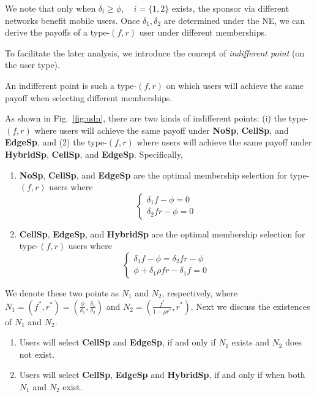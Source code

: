 We note that only when $\delta_i \ge \phi,\quad i=\{1,2\}$ exists, the sponsor via different networks benefit mobile users. Once $\delta_1, \delta_2$ are determined under the NE, we can derive the payoffs of a type-$(f, r)$ user under different memberships.

To facilitate the later analysis, we introduce the concept of \emph{indifferent point} (on the user type). 

\begin{myDef} An indifferent point is such a type-$(f, r)$ on which users will achieve the same payoff when selecting different memberships.\end{myDef}


As shown in Fig.~\ref{fig:udn}, there are two kinds of indifferent points: (i) the type-$(f, r)$ where users will achieve the same payoff under \textbf{NoSp}, \textbf{CellSp}, and \textbf{EdgeSp}, and (2) the type-$(f, r)$ where users will achieve the same payoff under \textbf{HybridSp}, \textbf{CellSp}, and \textbf{EdgeSp}. Specifically,

\begin{enumerate}
\item \textbf{NoSp}, \textbf{CellSp}, and \textbf{EdgeSp} are the optimal membership selection for type-$(f, r)$ users where
\begin{equation}
\left\{\begin{array}{ll}
\delta_1f-\phi=0\\
\delta_2fr-\phi=0
\end{array}\right.
\end{equation}

\item \textbf{CellSp}, \textbf{EdgeSp}, and \textbf{HybridSp} are the optimal membership selection for type-$(f, r)$ users where
\begin{equation}
\left\{\begin{array}{ll}
\delta_1f-\phi=\delta_2fr-\phi\\
\phi+\delta_1\rho fr-\delta_1f=0
\end{array}\right.
\end{equation}
\end{enumerate}

We denote these two points as $N_1$ and $N_2$, respectively, where $N_1=(f^*,r^*)=(\frac{\phi}{\delta_1},\frac{\delta_1}{\delta_2})$ and $N_2=(\frac{f^*}{1-\rho r^*}, r^*)$. Next we discuss the existences of $N_1$ and $N_2$. 
\begin{enumerate}
\item Users will select \textbf{CellSp} and \textbf{EdgeSp}, if and only if $N_1$ exists and $N_2$ does not exist.
\item Users will select \textbf{CellSp}, \textbf{EdgeSp} and \textbf{HybridSp}, if and only if when both $N_1$ and $N_2$ exist.

\end{enumerate}

